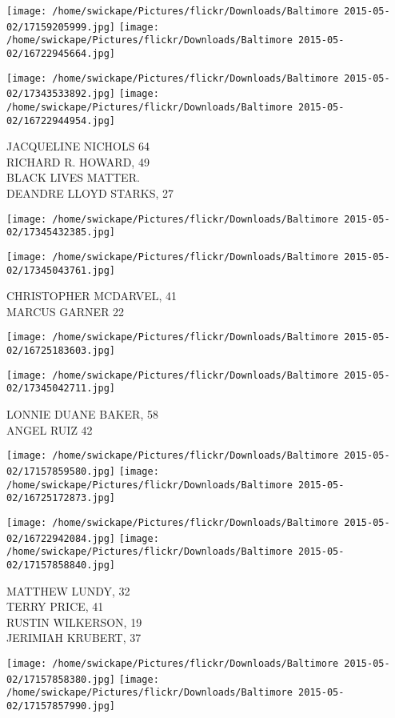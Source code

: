 \documentclass[10pt,letterpaper]{article}
\begin{document}
\texttt{[image: /home/swickape/Pictures/flickr/Downloads/Baltimore 2015-05-02/17159205999.jpg]}
\texttt{[image: /home/swickape/Pictures/flickr/Downloads/Baltimore 2015-05-02/16722945664.jpg]}

\texttt{[image: /home/swickape/Pictures/flickr/Downloads/Baltimore 2015-05-02/17343533892.jpg]}
\texttt{[image: /home/swickape/Pictures/flickr/Downloads/Baltimore 2015-05-02/16722944954.jpg]}

JACQUELINE NICHOLS 64\\
RICHARD R. HOWARD, 49\\
BLACK LIVES MATTER.\\
DEANDRE LLOYD STARKS, 27
\pagebreak

\texttt{[image: /home/swickape/Pictures/flickr/Downloads/Baltimore 2015-05-02/17345432385.jpg]}

\vspace{0.25in}
\texttt{[image: /home/swickape/Pictures/flickr/Downloads/Baltimore 2015-05-02/17345043761.jpg]}

CHRISTOPHER MCDARVEL, 41\\
MARCUS GARNER 22
\pagebreak

\texttt{[image: /home/swickape/Pictures/flickr/Downloads/Baltimore 2015-05-02/16725183603.jpg]}

\vspace{0.25in}
\texttt{[image: /home/swickape/Pictures/flickr/Downloads/Baltimore 2015-05-02/17345042711.jpg]}

LONNIE DUANE BAKER, 58\\
ANGEL RUIZ 42
\pagebreak

\texttt{[image: /home/swickape/Pictures/flickr/Downloads/Baltimore 2015-05-02/17157859580.jpg]}
\texttt{[image: /home/swickape/Pictures/flickr/Downloads/Baltimore 2015-05-02/16725172873.jpg]}

\texttt{[image: /home/swickape/Pictures/flickr/Downloads/Baltimore 2015-05-02/16722942084.jpg]}
\texttt{[image: /home/swickape/Pictures/flickr/Downloads/Baltimore 2015-05-02/17157858840.jpg]}

MATTHEW LUNDY, 32\\
TERRY PRICE, 41\\
RUSTIN WILKERSON, 19\\
JERIMIAH KRUBERT, 37
\pagebreak

\texttt{[image: /home/swickape/Pictures/flickr/Downloads/Baltimore 2015-05-02/17157858380.jpg]}
\texttt{[image: /home/swickape/Pictures/flickr/Downloads/Baltimore 2015-05-02/17157857990.jpg]}
\end{document}
